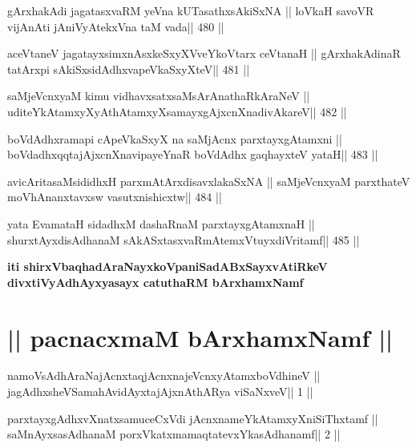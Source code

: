 \begin{shl}
gArxhakAdi jagatasxvaRM yeVna kUTasathxsAkiSxNA ||
loVkaH savoVR vijAnAti jAniVyAtekxVna taM vada\hfill || 480 ||
\end{shl}

\begin{shl}
aceVtaneV jagatayxsimxnAsxkeSxyXVveYkoV\s tarx ceVtanaH ||
gArxhakAdinaR tatArxpi sAkiSxsidAdhxvapeVkaSxyXteV\hfill || 481 ||
\end{shl}

\begin{shl}
saMjeVcnxyaM kimu vidhavxsatxsaMsArAnathaRkAraNeV ||
uditeYkAtamxyXyAthAtamxyXsamayxgAjxcnXnadivAkareV\hfill || 482 ||
\end{shl}

\begin{shl}
boVdAdhxramapi cApeVkaSxyX na saMjAcnx parxtayxgAtamxni ||
boVdadhxqqtajAjxcnXnavipayeYnaR boVdAdhx gaqhayxteV yataH\hfill || 483 ||
\end{shl}

\begin{shl}
avicAritasaMsididhxH parxmAtArxdisavxlakaSxNA ||
saMjeVcnxyaM parxthateV moVhAnanxtavxsw vasutxnishicxtw\hfill || 484 ||
\end{shl}

\begin{shl}
yata EvamataH sidadhxM dashaRnaM parxtayxgAtamxnaH ||
shurxtAyxdisAdhanaM sAkASxtasxvaRmAtemxVtuyxdiVritamf\hfill || 485 ||
\end{shl}


\begin{center}
{\bf iti shirxVbaqhadAraNayxkoVpaniSadABxSayxvAtiRkeV\\ 
divxtiVyAdhAyxyasayx catuthaRM bArxhamxNamf}
\end{center}


\section{|| pacnacxmaM bArxhamxNamf ||}

\begin{shl}
namoV\s sAdhAraNajAcnxtaqjAcnxnajeVcnxyAtamxboVdhineV ||
jagAdhxsheVSamahAvidAyxtajAjxnAthARya viSaNxveV\hfill || 1 ||
\end{shl}

\begin{shl}
parxtayxgAdhxvXnatxsamuceCxVdi jAcnxnameYkAtamxyXniSiThxtamf ||
saMnAyxsasAdhanaM porxVkatxmamaqtatevxYkasAdhanamf\hfill || 2 ||
\end{shl}

